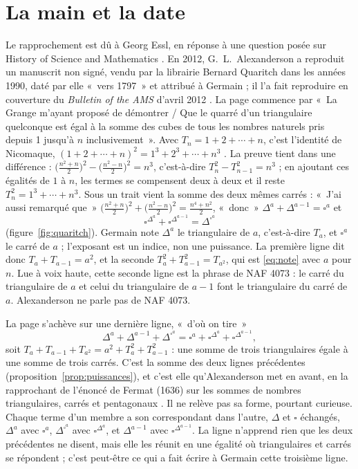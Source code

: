 \documentclass[11pt,a4paper]{article}
\theoremstyle{remark}
\begin{document}
\section{La main et la date}\label{sec:main}

Le rapprochement est dû à Georg Essl, en réponse à une question posée sur
History of Science and Mathematics \cite{essl}. En 2012,
G.~L.~Alexanderson a reproduit un manuscrit non signé, vendu par la librairie
Bernard Quaritch dans les années 1990, daté par elle «~vers 1797~» et
attribué à Germain ; il l'a fait reproduire en couverture du
\emph{Bulletin of the AMS} d'avril 2012 \cite{alexanderson}. La page commence
par «~La Grange m'ayant proposé de démontrer / Que le quarré d'un
triangulaire quelconque est égal à la somme des cubes de tous les nombres
naturels pris depuis 1 jusqu'à $n$ inclusivement~». Avec $T_n = 1 + 2 +
\cdots + n$, c'est l'identité de Nicomaque,
$(1 + 2 + \cdots + n)^2 = 1^3 + 2^3 + \cdots + n^3$
\cite[A000537]{oeis}. La preuve tient dans
une différence :
$\big(\frac{n^2+n}{2}\big)^2 - \big(\frac{n^2-n}{2}\big)^2 = n^3$,
c'est-à-dire $T_n^2 - T_{n-1}^2 = n^3$ ; en ajoutant ces égalités de
$1$ à $n$, les termes se compensent deux à deux et il reste
$T_n^2 = 1^3 + \cdots + n^3$. Sous un trait vient la somme des deux mêmes
carrés : «~J'ai aussi remarqué que~»
$\big(\frac{n^2+n}{2}\big)^2 + \big(\frac{n^2-n}{2}\big)^2 = \frac{n^4+n^2}{2}$,
«~donc~» $\Delta^a + \Delta^{a-1} = \square^a$ et
\[
\square^{\Delta^a} + \square^{\Delta^{a-1}} = \Delta^{\square^a}
\]
\cite[p.~330]{alexanderson} (figure~\ref{fig:quaritch}). Germain note $\Delta^a$ le triangulaire de $a$,
c'est-à-dire $T_a$, et $\square^a$ le carré de $a$ ; l'exposant est un indice, non
une puissance. La première ligne dit donc $T_a + T_{a-1} = a^2$, et la
seconde $T_a^2 + T_{a-1}^2 = T_{a^2}$, qui est \eqref{eq:note} avec $a$
pour $n$. Lue à voix haute, cette seconde ligne est la phrase de NAF 4073 :
le carré du triangulaire de $a$ et celui du triangulaire de $a-1$ font le
triangulaire du carré de $a$. Alexanderson ne parle pas de NAF 4073.

La page s'achève sur une dernière ligne, «~d'où on tire~»
\[
\Delta^a + \Delta^{a-1} + \Delta^{\square^a}
= \square^a + \square^{\Delta^a} + \square^{\Delta^{a-1}},
\]
soit $T_a + T_{a-1} + T_{a^2} = a^2 + T_a^2 + T_{a-1}^2$ : une somme de
trois triangulaires égale à une somme de trois carrés. C'est la somme des
deux lignes précédentes (proposition~\ref{prop:puissances}), et c'est elle
qu'Alexanderson met en avant, en la rapprochant de l'énoncé de Fermat
(1636) sur les sommes de nombres triangulaires, carrés et pentagonaux
\cite[p.~329]{alexanderson}. Il ne relève pas sa forme, pourtant curieuse.
Chaque terme d'un membre a son correspondant dans l'autre, $\Delta$ et $\square$
échangés, $\Delta^a$ avec $\square^a$, $\Delta^{\square^a}$ avec
$\square^{\Delta^a}$, et $\Delta^{a-1}$ avec $\square^{\Delta^{a-1}}$. La
ligne n'apprend rien que les deux précédentes ne disent, mais elle les
réunit en une égalité où triangulaires et carrés se répondent ; c'est
peut-être ce qui a fait écrire à Germain cette troisième ligne.
\end{document}
